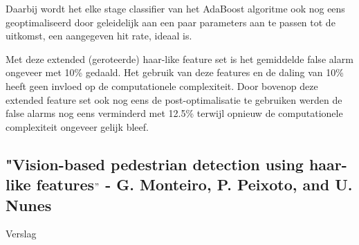 \documentclass[]{article}
\begin{document}
Daarbij wordt het elke stage classifier van het AdaBoost algoritme ook nog eens geoptimaliseerd door geleidelijk aan een paar parameters aan te passen tot de uitkomst, een aangegeven hit rate, ideaal is.

Met deze extended (geroteerde) haar-like feature set is het gemiddelde false alarm ongeveer met 10\% gedaald. Het gebruik van deze features en de daling van 10\% heeft geen invloed op de computationele complexiteit.
Door bovenop deze extended feature set ook nog eens de post-optimalisatie te gebruiken werden de false alarms nog eens verminderd met 12.5\% terwijl opnieuw de computationele complexiteit ongeveer gelijk bleef.


\subsection*{"Vision-based pedestrian detection using haar-like features$"$ - G. Monteiro, P. Peixoto, and U. Nunes}

Verslag
\end{document}
